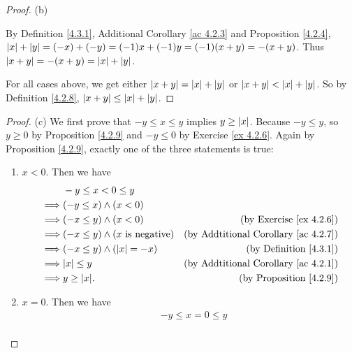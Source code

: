 \begin{proof}{(b)}
\begin{enumerate}[label=(\Roman*)]
\begin{enumerate}[label=(\roman*)]
                        By Definition \ref{4.3.1}, Additional Corollary \ref{ac 4.2.3} and Proposition \ref{4.2.4}, \(\abs*{x} + \abs*{y} = (-x) + (-y) = (-1)x + (-1)y = (-1)(x + y) = -(x + y)\).
                        Thus \(\abs*{x + y} = -(x + y) = \abs*{x} + \abs*{y}\).
              \end{enumerate}
    \end{enumerate}
    For all cases above, we get either \(\abs*{x + y} = \abs*{x} + \abs*{y}\) or \(\abs*{x + y} < \abs*{x} + \abs*{y}\).
    So by Definition \ref{4.2.8}, \(\abs*{x + y} \leq \abs*{x} + \abs*{y}\).
\end{proof}

\begin{proof}{(c)}
    We first prove that \(-y \leq x \leq y\) implies \(y \geq \abs*{x}\).
    Because \(-y \leq y\), so \(y \geq 0\) by Proposition \ref{4.2.9} and \(-y \leq 0\) by Exercise \ref{ex 4.2.6}.
    Again by Proposition \ref{4.2.9}, exactly one of the three statements is true:
    \begin{enumerate}[label=(\Roman*)]
        \item \(x < 0\).
              Then we have
              \begin{align*}
                           & -y \leq x < 0 \leq y                                                                         \\
                  \implies & (-y \leq x) \land (x < 0)                                                                    \\
                  \implies & (-x \leq y) \land (x < 0)                 & \text{(by Exercise \ref{ex 4.2.6})}              \\
                  \implies & (-x \leq y) \land (x \text{ is negative}) & \text{(by Addtitional Corollary \ref{ac 4.2.7})} \\
                  \implies & (-x \leq y) \land (\abs*{x} = -x)         & \text{(by Definition \ref{4.3.1})}               \\
                  \implies & \abs*{x} \leq y                           & \text{(by Addtitional Corollary \ref{ac 4.2.1})} \\
                  \implies & y \geq \abs*{x}.                          & \text{(by Proposition \ref{4.2.9})}
              \end{align*}
        \item \(x = 0\).
              Then we have
              \begin{align*}
                           & -y \leq x = 0 \leq y                                                               \\

\end{align*}
\end{enumerate}
\end{proof}
